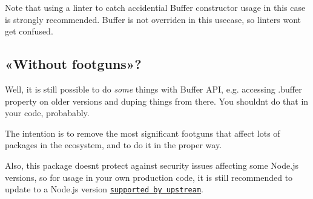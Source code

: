 Note that using a linter to catch accidential {\ttfamily Buffer} constructor usage in this case is strongly recommended. {\ttfamily Buffer} is not overriden in this usecase, so linters won\textquotesingle{}t get confused.

\subsection*{«\+Without footguns»?}

Well, it is still possible to do {\itshape some} things with {\ttfamily Buffer} A\+PI, e.\+g. accessing {\ttfamily .buffer} property on older versions and duping things from there. You shouldn\textquotesingle{}t do that in your code, probabably.

The intention is to remove the most significant footguns that affect lots of packages in the ecosystem, and to do it in the proper way.

Also, this package doesn\textquotesingle{}t protect against security issues affecting some Node.\+js versions, so for usage in your own production code, it is still recommended to update to a Node.\+js version \href{https://github.com/nodejs/release#release-schedule}{\tt supported by upstream}. 